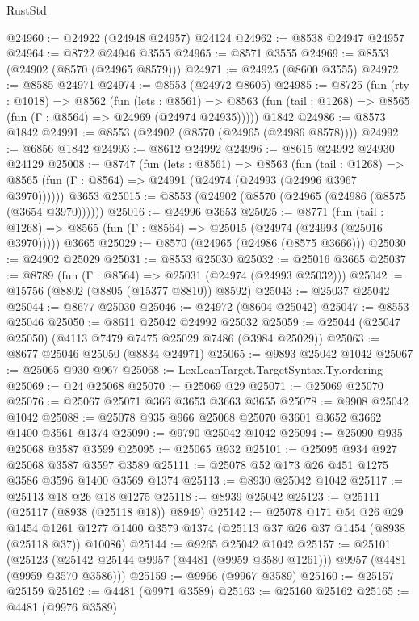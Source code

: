 \begin{lexlean}{RustStd}
\begin{coremodule}
@24960 := @24922 (@24948 @24957) @24124
@24962 := @8538 @24947 @24957
@24964 := @8722 @24946 @3555
@24965 := @8571 @3555
@24969 := @8553 (@24902 (@8570 (@24965 @8579)))
@24971 := @24925 (@8600 @3555)
@24972 := @8585 @24971
@24974 := @8553 (@24972 @8605)
@24985 := @8725
    (fun (rty : @1018) =>
    @8562
      (fun (lets : @8561) =>
      @8563 (fun (tail : @1268) => @8565 (fun (Γ : @8564) => @24969 (@24974 @24935)))))
    @1842
@24986 := @8573 @1842
@24991 := @8553 (@24902 (@8570 (@24965 (@24986 @8578))))
@24992 := @6856 @1842
@24993 := @8612 @24992
@24996 := @8615 @24992 @24930 @24129
@25008 := @8747
    (fun (lets : @8561) =>
    @8563
      (fun (tail : @1268) =>
      @8565 (fun (Γ : @8564) => @24991 (@24974 (@24993 (@24996 @3967 @3970))))))
    @3653
@25015 := @8553 (@24902 (@8570 (@24965 (@24986 (@8575 (@3654 @3970))))))
@25016 := @24996 @3653
@25025 := @8771
    (fun (tail : @1268) => @8565 (fun (Γ : @8564) => @25015 (@24974 (@24993 (@25016 @3970)))))
    @3665
@25029 := @8570 (@24965 (@24986 (@8575 @3666)))
@25030 := @24902 @25029
@25031 := @8553 @25030
@25032 := @25016 @3665
@25037 := @8789 (fun (Γ : @8564) => @25031 (@24974 (@24993 @25032)))
@25042 := @15756 (@8802 (@8805 (@15377 @8810)) @8592)
@25043 := @25037 @25042
@25044 := @8677 @25030
@25046 := @24972 (@8604 @25042)
@25047 := @8553 @25046
@25050 := @8611 @25042 @24992 @25032
@25059 := @25044 (@25047 @25050) (@4113 @7479 @7475 @25029 @7486 (@3984 @25029))
@25063 := @8677 @25046 @25050 (@8834 @24971)
@25065 := @9893 @25042 @1042
@25067 := @25065 @930 @967
@25068 := LexLeanTarget.TargetSyntax.Ty.ordering
@25069 := @24 @25068
@25070 := @25069 @29
@25071 := @25069 @25070
@25076 := @25067 @25071 @366 @3653 @3663 @3655
@25078 := @9908 @25042 @1042
@25088 := @25078 @935 @966 @25068 @25070 @3601 @3652 @3662 @1400 @3561 @1374
@25090 := @9790 @25042 @1042
@25094 := @25090 @935 @25068 @3587 @3599
@25095 := @25065 @932
@25101 := @25095 @934 @927 @25068 @3587 @3597 @3589
@25111 := @25078 @52 @173 @26 @451 @1275 @3586 @3596 @1400 @3569 @1374
@25113 := @8930 @25042 @1042
@25117 := @25113 @18 @26 @18 @1275
@25118 := @8939 @25042
@25123 := @25111 (@25117 (@8938 (@25118 @18)) @8949)
@25142 := @25078
    @171
    @54
    @26
    @29
    @1454
    @1261
    @1277
    @1400
    @3579
    @1374
    (@25113 @37 @26 @37 @1454 (@8938 (@25118 @37)) @10086)
@25144 := @9265 @25042 @1042
@25157 := @25101
    (@25123 (@25142 @25144 @9957 (@4481 (@9959 @3580 @1261))) @9957 (@4481 (@9959 @3570 @3586)))
@25159 := @9966 (@9967 @3589)
@25160 := @25157 @25159
@25162 := @4481 (@9971 @3589)
@25163 := @25160 @25162
@25165 := @4481 (@9976 @3589)

\end{coremodule}
\end{lexlean}
